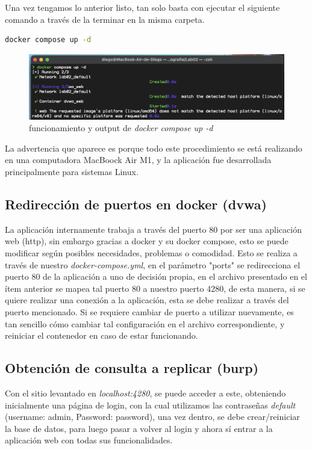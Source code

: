 \documentclass[letter,12pt]{article}
\begin{document}
Una vez tengamos lo anterior listo, tan solo basta con ejecutar el siguiente comando a través de la terminar en la misma carpeta.
\begin{lstlisting}[language=bash, caption={Levantamiento de contenedor}]
docker compose up -d
\end{lstlisting}
\begin{figure}[H]
    \centering
    \includegraphics[width=1\linewidth]{Imagenes/docker_compose_up.png}
    \caption{funcionamiento y output de \textit{docker compose up -d}}
    \label{fig:placeholder}
\end{figure}
La advertencia que aparece es porque todo este procedimiento se está realizando en una computadora MacBoock Air M1, y la aplicación fue desarrollada principalmente para sistemas Linux.

\subsection{Redirección de puertos en docker (dvwa)}

La aplicación internamente trabaja a través del puerto 80 por ser una aplicación web (http), sin embargo gracias a docker y su docker compose, esto se puede modificar según posibles necesidades, problemas o comodidad.
Esto se realiza a través de nuestro \textit{docker-compose.yml}, en el parámetro "ports" se redirecciona el puerto 80 de la aplicación a uno de decisión propia, en el archivo presentado en el ítem anterior se mapea tal puerto 80 a nuestro puerto 4280, de esta manera, si se quiere realizar una conexión a la aplicación, esta se debe realizar a través del puerto mencionado.
Si se requiere cambiar de puerto a utilizar nuevamente, es tan sencillo cómo cambiar tal configuración en el archivo correspondiente, y reiniciar el contenedor en caso de estar funcionando.

\subsection{Obtención de consulta a replicar (burp)}

Con el sitio levantado en \textit{localhost:4280}, se puede acceder a este, obteniendo inicialmente una página de login, con la cual utilizamos las contraseñas \textit{default} (username: admin, Password: password), una vez dentro, se debe crear/reiniciar la base de datos, para luego pasar a volver al login y ahora sí entrar a la aplicación web con todas sus funcionalidades.
\end{document}

